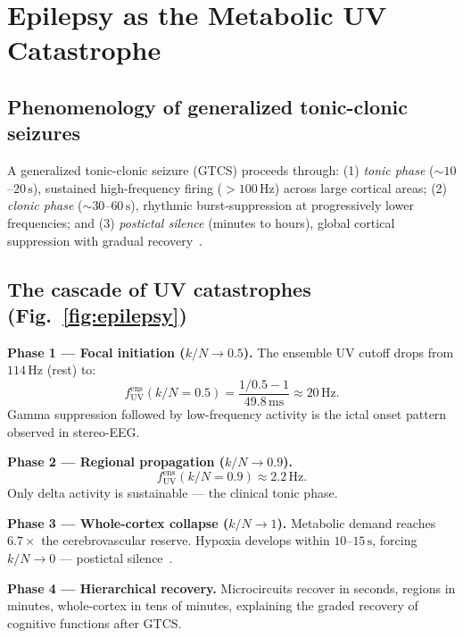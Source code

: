\documentclass[aps,pre,twocolumn,showpacs,superscriptaddress,longbibliography]{revtex4-2}
\newcommand{\kN}{k/N}
\newcommand{\fUV}{f_{\mathrm{UV}}}
\begin{document}
\section{\label{sec:epilepsy}Epilepsy as the Metabolic
         UV Catastrophe}

\subsection{Phenomenology of generalized tonic-clonic seizures}

A generalized tonic-clonic seizure (GTCS) proceeds through:
(1) \emph{tonic phase} ($\sim 10$--$20\,\mathrm{s}$), sustained
high-frequency firing ($>100\,\mathrm{Hz}$) across large cortical
areas; (2) \emph{clonic phase} ($\sim 30$--$60\,\mathrm{s}$),
rhythmic burst-suppression at progressively lower frequencies;
and (3) \emph{postictal silence} (minutes to hours), global
cortical suppression with gradual recovery~\cite{Krishnan2011}.

\subsection{The cascade of UV catastrophes
            (Fig.~\ref{fig:epilepsy})}

\textbf{Phase 1 --- Focal initiation ($\kN \to 0.5$).}
The ensemble UV cutoff drops from $114\,\mathrm{Hz}$ (rest) to:
\begin{equation}
  \fUV^{\mathrm{ens}}(\kN=0.5) = \frac{1/0.5 - 1}{49.8\,\mathrm{ms}}
  \approx 20\,\mathrm{Hz}.
\end{equation}
Gamma suppression followed by low-frequency activity is the
ictal onset pattern observed in stereo-EEG.

\textbf{Phase 2 --- Regional propagation ($\kN \to 0.9$).}
\begin{equation}
  \fUV^{\mathrm{ens}}(\kN=0.9) \approx 2.2\,\mathrm{Hz}.
\end{equation}
Only delta activity is sustainable --- the clinical tonic phase.

\textbf{Phase 3 --- Whole-cortex collapse ($\kN \to 1$).}
Metabolic demand reaches $6.7\times$ the cerebrovascular
reserve. Hypoxia develops within $10$--$15\,\mathrm{s}$,
forcing $\kN \to 0$ --- postictal silence~\cite{Perucca2014}.

\textbf{Phase 4 --- Hierarchical recovery.}
Microcircuits recover in seconds, regions in minutes,
whole-cortex in tens of minutes, explaining the graded
recovery of cognitive functions after GTCS.
\end{document}
